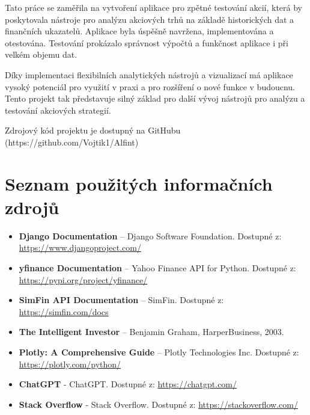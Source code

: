 \documentclass[12pt, a4paper]{report}
\begin{document}
Tato práce se zaměřila na vytvoření aplikace pro zpětné testování akcií, která by poskytovala nástroje pro analýzu akciových trhů na základě historických dat a finančních ukazatelů. Aplikace byla úspěšně navržena, implementována a otestována. Testování prokázalo správnost výpočtů a funkčnost aplikace i při velkém objemu dat.

Díky implementaci flexibilních analytických nástrojů a vizualizací má aplikace vysoký potenciál pro využití v praxi a pro rozšíření o nové funkce v budoucnu. Tento projekt tak představuje silný základ pro další vývoj nástrojů pro analýzu a testování akciových strategií.

 Zdrojový kód projektu je dostupný na GitHubu (https://github.com/Vojtik1/Alfint)

\chapter*{Seznam použitých informačních zdrojů}

\begin{itemize}
    \item \textbf{Django Documentation} – Django Software Foundation. Dostupné z: \url{https://www.djangoproject.com/}
    \item \textbf{yfinance Documentation} – Yahoo Finance API for Python. Dostupné z: \url{https://pypi.org/project/yfinance/}
    \item \textbf{SimFin API Documentation} – SimFin. Dostupné z: \url{https://simfin.com/docs}
    \item \textbf{The Intelligent Investor} – Benjamin Graham, HarperBusiness, 2003.
    \item \textbf{Plotly: A Comprehensive Guide} – Plotly Technologies Inc. Dostupné z: \url{https://plotly.com/python/}
    \item \textbf{ChatGPT} - ChatGPT. Dostupné z: \url{https://chatgpt.com/}
    \item \textbf{Stack Overflow} - Stack Overflow. Dostupné z: \url{https://stackoverflow.com/}
\end{itemize}
\end{document}
